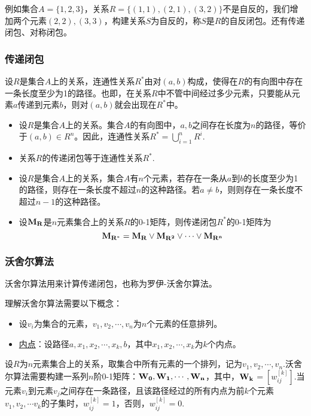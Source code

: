例如集合$A = \{1,2,3\}$，关系$R = \{(1,1), (2,1), (3,2)\}$不是自反的，我们增加两个元素$(2,2), (3,3)$，构建关系$S$为自反的，称$S$是$R$的自反闭包。还有传递闭包、对称闭包。

\subsubsection*{传递闭包}
设$R$是集合$A$上的关系，连通性关系$R^*$由对$(a,b)$构成，使得在$R$的有向图中存在一条长度至少为1的路径。也即，在关系$R$中不管中间经过多少元素，只要能从元素$a$传递到元素$b$，则对$(a,b)$就会出现在$R^*$中。

\begin{itemize}
    \item 设$R$是集合$A$上的关系。集合$A$的有向图中，$a,b$之间存在长度为$n$的路径，等价于$(a,b) \in R^n$。因此，连通性关系$R^* = \displaystyle \bigcup _{i=1}^n R^i$.
    \item 关系$R$的传递闭包等于连通性关系$R^*$.
    \item 设$R$是集合$A$上的关系，集合$A$有$n$个元素，若存在一条从$a$到$b$的长度至少为1的路径，则存在一条长度不超过$n$的这种路径。若$a \neq b$，则则存在一条长度不超过$n-1$的这种路径。
    \item 设$\bf M_R$是$n$元素集合上的关系$R$的0-1矩阵，则传递闭包$R^*$的0-1矩阵为
    \[\bf M_{R^*} = \bf M_R \vee \bf M_{R^2} \vee \cdots \vee \bf M_{R^n}\]
\end{itemize}

\subsubsection*{沃舍尔算法}
沃舍尔算法用来计算传递闭包，也称为罗伊-沃舍尔算法。

理解沃舍尔算法需要以下概念：
\begin{itemize}
    \item 设$v_i$为集合的元素，$v_1,v_2,\cdots,v_n$为$n$个元素的任意排列。
    \item \uline{内点}：设路径$a, x_1, x_2, \cdots, x_k, b$，其中$x_1, x_2, \cdots, x_k$为$k$个内点。
\end{itemize}

设$R$为$n$元素集合上的关系，取集合中所有元素的一个排列，记为$v_1,v_2,\cdots, v_n$.沃舍尔算法需要构建一系列$n$阶0-1矩阵：$\bf W_0, \bf W_1, \cdots, \bf W_n$，其中，$\bf{W_k}$$= [w _{ij}^{[k]}]$.当元素$v_i$到元素$v_j$之间存在一条路径，且该路径经过的所有内点为前$k$个元素$v_1, v_2, \cdots v_k$的子集时，$w _{ij}^{[k]} = 1$，否则，$w _{ij}^{[k]} = 0$.

